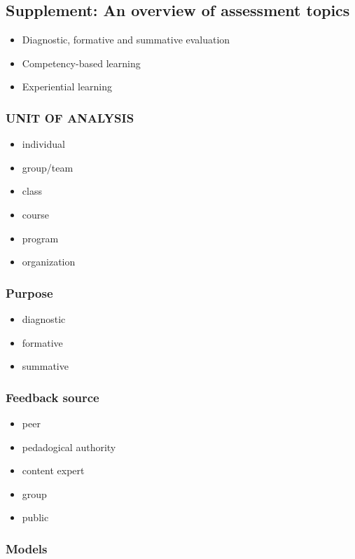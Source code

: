 \subsection{Supplement: An overview of assessment topics}

\begin{itemize}
\item
  Diagnostic, formative and summative evaluation
\item
  Competency-based learning
\item
  Experiential learning
\end{itemize}
\subsubsection{UNIT OF ANALYSIS}

\begin{itemize}
\item
  individual
\item
  group/team
\item
  class
\item
  course
\item
  program
\item
  organization
\end{itemize}
\subsubsection{Purpose}

\begin{itemize}
\item
  diagnostic
\item
  formative
\item
  summative
\end{itemize}
\subsubsection{Feedback source}

\begin{itemize}
\item
  peer
\item
  pedadogical authority
\item
  content expert
\item
  group
\item
  public
\end{itemize}
\subsubsection{Models}

